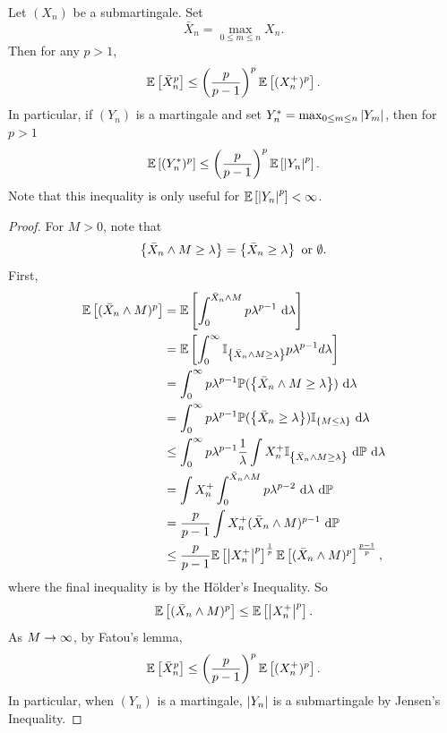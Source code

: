 \begin{thm}
    Let $(X_n)$ be a submartingale. Set
    \begin{equation*}
        \bar{X}_n = \max_{0 \leq m \leq n} X_n.
    \end{equation*}
    Then for any $p > 1$,
    \begin{equation*}
        \mathbb{E}\left[\bar{X}_n^p\right] \leq \left(\frac{p}{p-1}\right)^p \mathbb{E}\left[(X_n^+)^p\right].
    \end{equation*}
    In particular, if $(Y_n)$ is a martingale and set $Y_n^* = \max_{0 \leq m \leq n}\left\lvert Y_m\right\lvert$, then for $p > 1$
    \begin{equation*}
        \mathbb{E}\left[(Y^*_n)^p\right] \leq \left(\frac{p}{p-1}\right)^p \mathbb{E}\left[\left\lvert Y_n\right\lvert^p\right].
    \end{equation*}
    Note that this inequality is only useful for $\mathbb{E}\left[\left\lvert Y_n\right\lvert^p\right] < \infty$.
\end{thm}
\begin{proof}
    For $M > 0$, note that
    \begin{equation*}
        \left\{\bar{X}_n \wedge M \geq \lambda\right\} = \left\{\bar{X}_n \geq \lambda\right\} \text{ or } \emptyset.
    \end{equation*}
    First,
    \begin{equation*}
        \begin{aligned}
            \mathbb{E}\left[(\bar{X}_n \wedge M)^p\right] &= \mathbb{E}\left[\int_0^{\bar{X}_n \wedge M}p\lambda^{p-1}~\mathrm{d}\lambda \right] \\
            &= \mathbb{E}\left[\int_0^\infty \mathbb{I}_{\left\{\bar{X}_n \wedge M \geq \lambda\right\}} p\lambda^{p-1}d\lambda\right] \\
            &= \int_0^\infty p\lambda^{p-1} \mathbb{P}(\left\{\bar{X}_n \wedge M \geq \lambda\right\}) ~\mathrm{d}\lambda \\
            &= \int_0^\infty p\lambda^{p-1} \mathbb{P}(\left\{\bar{X}_n \geq \lambda\right\})\mathbb{I}_{\left\{M \leq \lambda\right\}} ~\mathrm{d}\lambda \\
            &\leq \int_0^\infty p\lambda^{p-1} \frac{1}{\lambda} \int X_n^+ \mathbb{I}_{\left\{\bar{X}_n \wedge M \geq \lambda\right\}} ~\mathrm{d}\mathbb{P}~\mathrm{d}\lambda \\
            &= \int X_n^+ \int_0^{\bar{X}_n \wedge M}p\lambda^{p-2} ~\mathrm{d}\lambda~\mathrm{d}\mathbb{P} \\
            &= \frac{p}{p-1}\int X_n^+ (\bar{X}_n \wedge M)^{p-1} ~\mathrm{d}\mathbb{P} \\
            &\leq \frac{p}{p-1} \mathbb{E}\left[\left\lvert X_n^+\right\lvert^p\right]^{\frac{1}{p}}\mathbb{E}\left[(\bar{X}_n \wedge M)^p\right]^{\frac{p-1}{p}},
        \end{aligned}
    \end{equation*}
    where the final inequality is by the H\"older's Inequality. So
    \begin{equation*}
        \mathbb{E}\left[(\bar{X}_n \wedge M)^p\right] \leq \mathbb{E}\left[\left\lvert X_n^+\right\lvert^p\right].
    \end{equation*}
    As $M \rightarrow \infty$, by Fatou's lemma,
    \begin{equation*}
        \mathbb{E}\left[\bar{X}_n^p\right] \leq \left(\frac{p}{p-1}\right)^p \mathbb{E}\left[(X_n^+)^p\right].
    \end{equation*}
    In particular, when $(Y_n)$ is a martingale, $\left\lvert Y_n\right\lvert$ is a submartingale by Jensen's Inequality. \qedhere
\end{proof}

